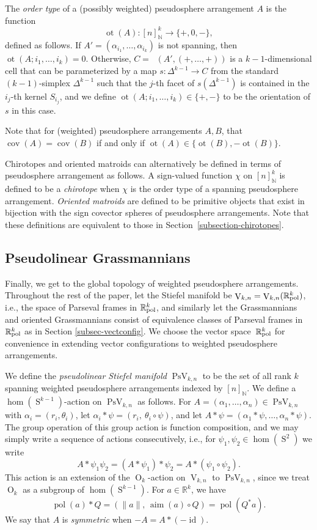 \documentclass[11pt]{article}
\newcommand{\ie}{i.e.,\xspace}
\numberwithin{equation}{section}
\theoremstyle{remark}
\let\mb\mathbb
\let\df\emph
\DeclareMathOperator{\orth}{O}
\DeclareMathOperator{\stief}{V}
\DeclareMathOperator{\pstief}{PsV}
\DeclareMathOperator{\sphere}{S}
\DeclareMathOperator{\Cell}{\overline{cell}}
\newcommand{\Rpol}[1]{\mb{R}\mathrlap{{}^{#1}}{}_\text{pol}}
\DeclareMathOperator{\pol}{pol}
\DeclareMathOperator{\aim}{aim}
\DeclareMathOperator{\id}{id}
\DeclareMathOperator{\cov}{cov}
\DeclareMathOperator{\ot}{ot}
\begin{document}
The \df{order type} of a (possibly weighted) pseudosphere arrangement $A$ is the function
\[ \ot (A) : [n]_\mb{N}^k \to \{+,0,-\}, \]
defined as follows.
If $A' = (\alpha_{i_1},\dots,\alpha_{i_k})$ is not spanning, then $\ot(A;i_1,\dots,i_k) = 0$.
Otherwise, $C = \Cell(A',(+,\dots,+))$ is a $k{-}1$-dimensional cell that can be parameterized by a map $s : \Delta^{k-1} \to C$ from the standard $(k{-}1)$-simplex $\Delta^{k-1}$ such that the $j$-th facet of $s(\Delta^{k-1})$ is contained in the $i_j$-th kernel $S_{{i_j}}$,
and we define $\ot(A;i_1,\dots,i_k) \in \{+,-\}$ to be the orientation of $s$ in this case.

Note that for (weighted) pseudosphere arrangements $A,B$, that $\cov(A) = \cov(B)$ if and only if $\ot(A) \in \{\ot(B),-\ot(B)\}$.

Chirotopes and oriented matroids can alternatively be defined in terms of pseudosphere arrangement as follows.
A sign-valued function $\chi$ on $[n]_\mb{N}^k$ is defined to be a \df{chirotope} when $\chi$ is the order type of a spanning pseudosphere arrangement.
\df{Oriented matroids} are defined to be primitive objects that exist in bijection with the sign covector spheres of pseudosphere arrangements.
Note that these definitions are equivalent to those in Section~\ref{subsection-chirotopes}.

\subsection{Pseudolinear Grassmannians}\label{subsection-psg-def}

Finally, we get to the global topology of weighted pseudosphere arrangements.
Throughout the rest of the paper, let the Stiefel manifold be $\stief_{k,n} = \stief_{k,n}(\Rpol{k})$, \ie the space of Parseval frames in $\Rpol{k}$, and similarly let the Grassmannians and oriented Grassmannians consist of equivalence classes of Parseval frames in $\Rpol{k}$ as in Section \ref{subsec-vectconfig}. We choose the vector space~$\Rpol{k}$ for convenience in extending vector configurations to weighted pseudosphere arrangements.

We define the \df{pseudolinear Stiefel manifold} $\pstief_{k,n}$ to be the set of all rank $k$ spanning weighted pseudosphere arrangements indexed by $[n]_\mb{N}$.
We define a $\hom(\sphere^{k-1})$-action on $\pstief_{k,n}$ as follows.
For $A = (\alpha_1,\dots,\alpha_n) \in \pstief_{k,n}$ with $\alpha_i = (r_i,\theta_i)$, let
$\alpha_i * \psi = (r_i,\ \theta_i \circ \psi)$, and let
$A*\psi = (\alpha_1*\psi,\dots,\alpha_n*\psi)$. The group operation of this group action is function composition, and we may simply write a sequence of actions consecutively, \ie for $\psi_1,\psi_2 \in \hom(\sphere^2)$ we write
\[ A*\psi_1\psi_2 = (A*\psi_1)*\psi_2 = A*(\psi_1\circ\psi_2). \]
This action is an extension of the $\orth_k$-action on $\stief_{k,n}$ to $\pstief_{k,n}$, since we treat $\orth_k$ as a subgroup of $\hom(\sphere^{k-1})$. For $a \in \mb{R}^k$, we have
\[ \pol(a)*Q = (\|a\|,\, \aim (a) \circ Q) = \pol(Q^* a).\]
We say that $A$ is \df{symmetric} when $-A = A*(-\id)$.
\end{document}
